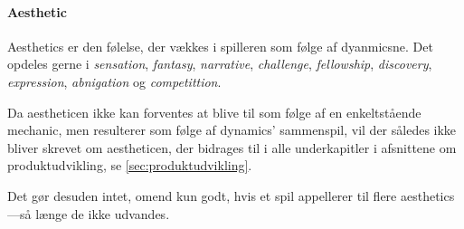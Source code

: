 \paragraph{Aesthetic} Aesthetics er den følelse, der vækkes i spilleren som følge af dyanmicsne. Det opdeles gerne i \textit{sensation}, \textit{fantasy}, \textit{narrative}, \textit{challenge}, \textit{fellowship}, \textit{discovery}, \textit{expression}, \textit{abnigation} og \textit{competittion}.

Da aestheticen ikke kan forventes at blive til som følge af en enkeltstående mechanic, men resulterer som følge af dynamics' sammenspil, vil der således ikke bliver skrevet om aestheticen, der bidrages til i alle underkapitler i afsnittene om produktudvikling, se \autoref{sec:produktudvikling}.

Det gør desuden intet, omend kun godt, hvis et spil appellerer til flere aesthetics---så længe de ikke udvandes.
